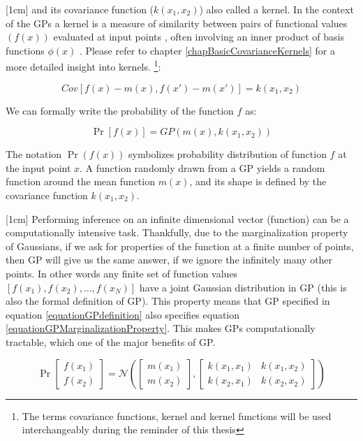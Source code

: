 [1cm]
and its covariance function ($k(x_{1}, x_{2})$) also called a kernel. In the context of the GPs a kernel is a measure of similarity between pairs of functional values $(f(x))$ evaluated at input points , often involving an inner product of basis functions $\phi(x)$ \cite{bishop2006pattern}. Please refer to chapter \ref{chapBasicCovarianceKernels} for a more detailed insight into kernels.   \footnote{The terms covariance functions, kernel and kernel functions will be used interchangeably during the reminder of this thesis}:

\begin{equation}\label{eq:covarianceGP}
Cov[f(x) - m(x), f(x') - m(x')] = k(x_{1}, x_{2})
\end{equation}

We can formally write the probability of the function $f$ as:

\begin{equation}\label{equationGPdefinition}
\Pr[f(x)] = GP(m(x), k(x_{1}, x_{2}))
\end{equation}

The notation $\Pr(f( x))$ symbolizes probability distribution of function $f$ at the input point $x$. A function randomly drawn from a GP yields a random function around the mean function $m(x)$, and its shape is defined by the covariance function $k(x_{1}, x_{2})$. 

[1cm]
Performing inference on an infinite dimensional vector (function) can be a computationally intensive task. Thankfully, due to the marginalization property of Gaussians, if we ask for properties of the function at a finite number of points, then  GP will give us the same answer, if we ignore the infinitely many other points. In other words any finite set of function values $[f(x_{1}), f(x_{2}), \ldots, f(x_{N})]$ have a joint Gaussian distribution in GP (this is also the formal definition of GP). This property means that GP specified in equation \ref{equationGPdefinition} also specifies equation \ref{equationGPMarginalizationProperty}. This makes GPs computationally tractable, which one of the major benefits of GP. 

\begin{equation}\label{equationGPMarginalizationProperty}
\Pr\left [ \begin{matrix}
f(x_{1})
\\ f(x_{2})
\end{matrix} \right ] = \mathcal{N}\left (\left [ \begin{matrix}
m(x_{1})
\\ m(x_{2})

\end{matrix} \right ] , \left [ \begin{matrix}
k(x_{1}, x_{1}) & k(x_{1}, x_{2})\\ 
k(x_{2}, x_{1}) & k(x_{2}, x_{2})
\end{matrix} \right ] \right )
\end{equation}


